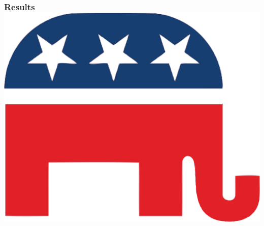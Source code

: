 \documentclass[xcolor=dvipsnames]{beamer}
\begin{document}
\begin{frame}
\end{frame}

\begin{frame}
\frametitle{Results \hfill \includegraphics[scale=.1]{republicanlogo.png}}

\end{frame}
\end{document}

